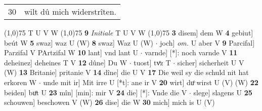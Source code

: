 \documentclass[8pt,a4paper,notitlepage]{article}
\begin{document}
\begin{table}[ht]
\begin{minipage}[t]{0.5\linewidth}
\begin{tabular}{rl}
30 & wilt dû mich widerstrîten.\\ 
\end{tabular}
\scriptsize
\line(1,0){75} \newline
T U V W \newline
\line(1,0){75} \newline
\textbf{9} \textit{Initiale} T U V W  \newline
\line(1,0){75} \newline
\textbf{3} disem] dem W \textbf{4} gebiut] beút W \textbf{5} swaz] waz U (W) \textbf{8} swaz] Waz U (W)  $\cdot$ joch] \textit{om.} U aber V \textbf{9} Parcifal] Parzifal V PArtzifal W \textbf{10} lant] vnd lant U  $\cdot$ varnde] [*]: noch varnde V \textbf{11} deheinez] deheines T V \textbf{12} dûne] Du W  $\cdot$ tuost] tvͦz T  $\cdot$ sicher] sicherheit U V (W) \textbf{13} Britanie] pritanie V \textbf{14} dîne] die U V \textbf{17} Die weil sy die schuld nit hat erkoren W  $\cdot$ unde mit ir] Mit irre U [*t]: ane ir V \textbf{20} wirt] duͦ wirst U (V) (W) \textbf{22} beiden] buͦt U \textbf{23} mîn] [min]: mir V \textbf{24} die] [*]: Vnde die V  $\cdot$ slege] slagens U \textbf{25} schouwen] beschowen V (W) \textbf{26} dise] die W \textbf{30} mich] mich is U (V) \newline
\end{minipage}
\end{table}
\end{document}
